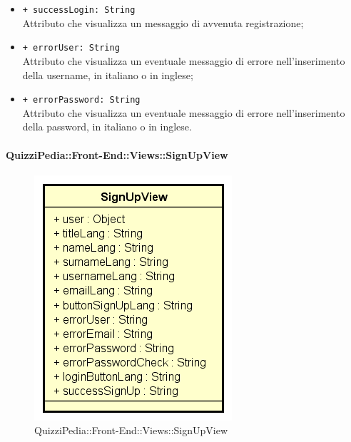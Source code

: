 \begin{itemize}
\begin{itemize}
		\item \texttt{+ successLogin: String} \\ Attributo che visualizza un messaggio di avvenuta registrazione;
		\item \texttt{+ errorUser: String} \\ Attributo che visualizza un eventuale messaggio di errore nell'inserimento della username, in italiano o in inglese;
		\item \texttt{+ errorPassword: String} \\ Attributo che visualizza un eventuale messaggio di errore nell'inserimento della password, in italiano o in inglese.
	\end{itemize}
\end{itemize}


\paragraph{QuizziPedia::Front-End::Views::SignUpView}
\begin{figure} [ht]
	\centering
	\includegraphics[scale=0.80]{UML/Classi/Front-End/QuizziPedia_Front-end_Views_SignUpView.png}
	\caption{QuizziPedia::Front-End::Views::SignUpView}
\end{figure} \FloatBarrier
